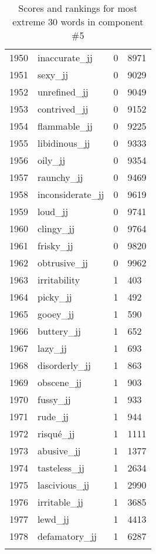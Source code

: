 \begin{longtable}[!htbp]{| rlr@{.}l |}
    1950 & inaccurate\_jj & 0 & 8971 \\
    1951 & sexy\_jj & 0 & 9029 \\
    1952 & unrefined\_jj & 0 & 9049 \\
    1953 & contrived\_jj & 0 & 9152 \\
    1954 & flammable\_jj & 0 & 9225 \\
    1955 & libidinous\_jj & 0 & 9333 \\
    1956 & oily\_jj & 0 & 9354 \\
    1957 & raunchy\_jj & 0 & 9469 \\
    1958 & inconsiderate\_jj & 0 & 9619 \\
    1959 & loud\_jj & 0 & 9741 \\
    1960 & clingy\_jj & 0 & 9764 \\
    1961 & frisky\_jj & 0 & 9820 \\
    1962 & obtrusive\_jj & 0 & 9962 \\
    1963 & irritability & 1 & 403 \\
    1964 & picky\_jj & 1 & 492 \\
    1965 & gooey\_jj & 1 & 590 \\
    1966 & buttery\_jj & 1 & 652 \\
    1967 & lazy\_jj & 1 & 693 \\
    1968 & disorderly\_jj & 1 & 863 \\
    1969 & obscene\_jj & 1 & 903 \\
    1970 & fussy\_jj & 1 & 933 \\
    1971 & rude\_jj & 1 & 944 \\
    1972 & risqué\_jj & 1 & 1111 \\
    1973 & abusive\_jj & 1 & 1377 \\
    1974 & tasteless\_jj & 1 & 2634 \\
    1975 & lascivious\_jj & 1 & 2990 \\
    1976 & irritable\_jj & 1 & 3685 \\
    1977 & lewd\_jj & 1 & 4413 \\
    1978 & defamatory\_jj & 1 & 6287 \\
    \hline
    \caption{Scores and rankings for most extreme 30 words in component \#5} \\
\end{longtable}
